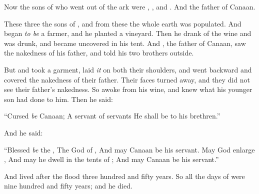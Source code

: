
\bverse Now the sons of  who went out of the ark were , , and . And  \was the father of Canaan.

\bverse These three  the sons of , and from these the whole earth was populated.
\bverse And  began \textit{to be} a farmer, and he planted a vineyard.
\bverse Then he drank of the wine and was drunk, and became uncovered in his tent.
\bverse And , the father of Canaan, saw the nakedness of his father, and told his two brothers outside.

\bverse But  and  took a garment, laid \textit{it} on both their shoulders, and went backward and covered the nakedness of their father. Their faces \were turned away, and they did not see their father's nakedness.
\bverse So  awoke from his wine, and knew what his younger son had done to him.
\bverse Then he said:
\begin{bquotation}
``Cursed \textit{be} Canaan; A servant of servants He shall be to his brethren.''
\end{bquotation}
\bverse And he said:
\begin{bquotation}
``Blessed \textit{be} the \lord, The God of , And may Canaan be his servant.
\bverse May God enlarge , And may he dwell in the tents of ; And may Canaan be his servant.''
\end{bquotation}

\bverse And  lived after the flood three hundred and fifty years.
\bverse So all the days of  were nine hundred and fifty years; and he died.
